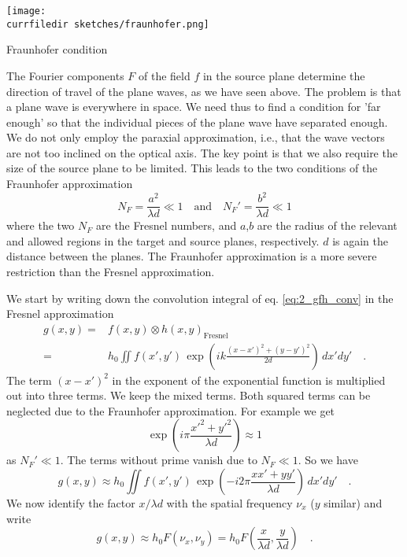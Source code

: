 \begin{marginfigure}
    \texttt{[image: \\currfiledir sketches/fraunhofer.png]}
    \caption{Fraunhofer condition}
\end{marginfigure}

The Fourier components $F$ of the field $f$ in the source plane determine the direction of travel of the plane waves, as we have seen above. The problem is that a plane wave is everywhere in space. We need thus to find a condition for 'far enough' so that the individual pieces of the plane wave have separated enough. We do not only employ the paraxial approximation, i.e., that the wave vectors are not too inclined on the optical axis. The key point is that we also require the size of the source plane to be limited. This leads to the two conditions of the Fraunhofer approximation
\begin{equation}
    N_F =  \frac{a^2}{\lambda d} \ll 1 \quad \text{and} \quad
    N_{F}' =  \frac{b^2}{\lambda d} \ll 1 
\end{equation}
where the two $N_F$ are the Fresnel numbers, and $a$,$b$ are the radius of the relevant and allowed regions in the target and source planes, respectively. $d$ is again the distance between the  planes. The Fraunhofer approximation is a more severe restriction than the Fresnel approximation.

We start by writing down the convolution integral of eq. \ref{eq:2_gfh_conv} in the Fresnel approximation
\begin{align}
    g(x,y) = & f(x,y) \otimes h(x,y)_\text{Fresnel} \\
 = & h_0 \iint f(x', y') \,  \exp \left(i k \frac{(x-x')^2 + (y-y')^2 }{2d} \right)  \, dx' dy' \quad .
\end{align}
The term $(x-x')^2$ in the exponent of the exponential function is multiplied out into three terms. 
We keep the mixed terms. Both squared terms can be neglected due to the Fraunhofer approximation. For example  we get 
\begin{equation}
    \exp \left(i \pi  \frac{x'^2 + y'^2 }{ \lambda d} \right) \approx 1
\end{equation}
as  $N_{F}' \ll 1$. The terms without prime vanish due to $N_{F} \ll 1$. So we have
\begin{equation}
    g(x,y)  \approx h_0   
     \iint f(x', y') \,  \exp \left(-i 2 \pi \frac{x x' + y y' }{\lambda d} \right)  \, dx' dy' \quad .
\end{equation}
We now identify  the factor $x / \lambda d$ with the spatial frequency  $\nu_x$ ($y$ similar) and write
\begin{equation}
    g(x,y) \approx h_0
     F \left( \nu_x,\nu_y \right) 
     =  h_0
     F \left( \frac{x}{\lambda d}, \frac{y}{\lambda d} \right) \quad .
\end{equation}

